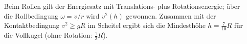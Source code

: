 \begin{merksatz}
Beim Rollen gilt der Energiesatz mit Translations- plus Rotationsenergie;
über die Rollbedingung $\omega=v/r$ wird $v^2(h)$ gewonnen. Zusammen mit der
Kontaktbedingung $v^2\ge gR$ im Scheitel ergibt sich die Mindesthöhe
$h=\frac{7}{10}R$ für die Vollkugel (ohne Rotation: $\frac12 R$).
\end{merksatz}
